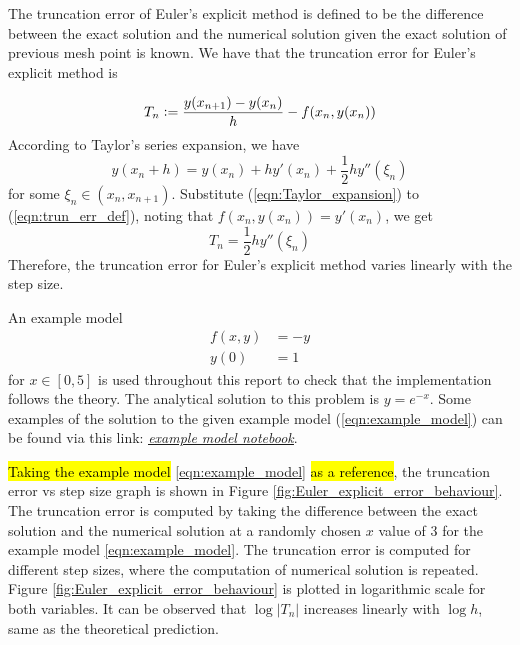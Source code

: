 The truncation error of Euler's explicit method is defined to be the difference between the exact solution and the numerical solution given the exact solution of previous mesh point is known. We have that the truncation error for Euler's explicit method is

\begin{equation}
\label{eqn:trun_err_def}
    T_n \vcentcolon= \frac{y(x_{n+1}) - y(x_{n})}{h} - f(x_n, y(x_n))
\end{equation}
According to Taylor's series expansion, we have 
\begin{equation}
\label{eqn:Taylor_expansion}
    y(x_n + h) = y(x_n) + hy'(x_n) + \frac{1}{2}hy''(\xi_n)
\end{equation}
for some $\xi_n \in (x_n, x_{n+1})$. Substitute (\ref{eqn:Taylor_expansion}) to (\ref{eqn:trun_err_def}), noting that $f(x_n, y(x_n)) = y'(x_n)$, we get
\begin{equation}
    T_n = \frac{1}{2}hy''(\xi_n)
\end{equation}
Therefore, the truncation error for Euler's explicit method varies linearly with the step size.

An example model 
\begin{align}
\label{eqn:example_model}
    f(x,y) &= -y \\
    y(0) &= 1
\end{align}
for $x \in [0, 5]$ is used throughout this report to check that the implementation follows the theory. The analytical solution to this problem is $y = e^{-x}$. Some examples of the solution to the given example model (\ref{eqn:example_model}) can be found via this link: \href{https://nbviewer.jupyter.org/github/FarmHJ/numerical-solver/blob/main/examples/solver_convergence.ipynb}{\underline{\emph{example model notebook}}}.

\hl{Taking the example model} \ref{eqn:example_model} \hl{as a reference}, the truncation error vs step size graph is shown in Figure \ref{fig:Euler_explicit_error_behaviour}. The truncation error is computed by taking the difference between the exact solution and the numerical solution at a randomly chosen $x$ value of 3 for the example model \ref{eqn:example_model}. The truncation error is computed for different step sizes, where the computation of numerical solution is repeated. Figure \ref{fig:Euler_explicit_error_behaviour} is plotted in logarithmic scale for both variables. It can be observed that $\log |T_n|$ increases linearly with $\log h$, same as the theoretical prediction. 

